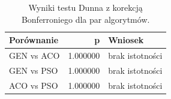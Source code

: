 \begin{table}
\caption{Wyniki testu Dunna z korekcją Bonferroniego dla par algorytmów.}
\label{tab:dunn_pairs}
\begin{tabular}{lrl}
\toprule
Porównanie & p & Wniosek \\
\midrule
GEN vs ACO & 1.000000 & brak istotności \\
GEN vs PSO & 1.000000 & brak istotności \\
ACO vs PSO & 1.000000 & brak istotności \\
\bottomrule
\end{tabular}
\end{table}
